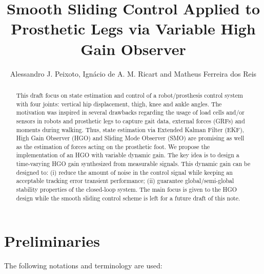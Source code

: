 \documentclass[letterpaper, 10 pt, conference]{ieeeconf}  %
\title{\LARGE \bf
Smooth Sliding Control Applied to Prosthetic Legs via Variable High Gain Observer}
\author{Alessandro J. Peixoto, %
        Ign\'{a}cio de A. M. Ricart and
        Matheus Ferreira dos Reis %
}
\theoremstyle{plain}
\theoremstyle{definition}
\theoremstyle{remark}
\begin{document}
\onecolumn

\maketitle
\thispagestyle{empty}
\pagestyle{empty}
\begin{abstract}%
This draft focus on state estimation and control of a robot/prosthesis control system with four joints: vertical hip displacement, thigh, knee and ankle angles. The motivation was inspired in several drawbacks regarding the usage of load cells and/or sensors in robots and prosthetic legs to capture gait data, external forces (GRFs) and moments during walking. Thus, state estimation via Extended Kalman Filter (EKF), High Gain Observer (HGO) and Sliding Mode Observer (SMO) are promising as well as the estimation of forces acting on the prosthetic foot. We propose the implementation of an HGO with variable dynamic gain. The key idea is to design a time-varying HGO gain synthesized from measurable signals. This dynamic gain can be designed to: (i) reduce the amount of noise in the control signal while keeping an acceptable tracking error  transient performance; (ii) guarantee global/semi-global stability properties of the closed-loop system. The main focus is given to the HGO design while the smooth sliding control scheme is left for a future draft of this note. 
\end{abstract}
\section{Preliminaries}


The following notations and terminology are used:%



\end{document}
